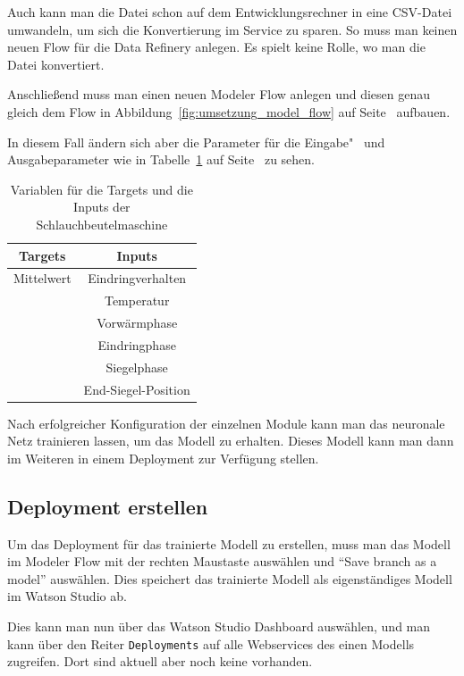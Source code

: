 Auch kann man die Datei schon auf dem Entwicklungsrechner in eine CSV-Datei umwandeln, um sich die Konvertierung im
Service zu sparen. So muss man keinen neuen Flow für die Data Refinery anlegen. Es spielt keine Rolle, wo man die Datei
konvertiert.

Anschließend muss man einen neuen Modeler Flow anlegen und diesen genau gleich dem Flow in
Abbildung~\ref{fig:umsetzung_model_flow} auf Seite~\pageref{fig:umsetzung_model_flow} aufbauen.

In diesem Fall ändern sich aber die Parameter für die Eingabe"~ und Ausgabeparameter wie in
Tabelle~\ref{tab:targets_inputs_siegeln} auf Seite~\pageref{tab:targets_inputs_siegeln} zu sehen.

\begin{table}[h]
    \centering
    \begin{tabular}{|c|c|}
        \hline
        \textbf{Targets} & \textbf{Inputs}\\
        \hline
        \hline
        Mittelwert & Eindringverhalten\\
        \hline
        & Temperatur\\
        \hline
        & Vorwärmphase\\
        \hline
        & Eindringphase\\
        \hline
        & Siegelphase\\
        \hline
        & End-Siegel-Position\\
        \hline
    \end{tabular}
    \caption{Variablen für die Targets und die Inputs der Schlauchbeutelmaschine}
    \label{tab:targets_inputs_siegeln}
\end{table}

Nach erfolgreicher Konfiguration der einzelnen Module kann man das neuronale Netz trainieren lassen, um das Modell zu
erhalten. Dieses Modell kann man dann im Weiteren in einem Deployment zur Verfügung stellen.

\subsection{Deployment erstellen}
Um das Deployment für das trainierte Modell zu erstellen, muss man das Modell im Modeler Flow mit der rechten Maustaste
auswählen und \enquote{Save branch as a model} auswählen. Dies speichert das trainierte Modell als eigenständiges Modell
im Watson Studio ab.

Dies kann man nun über das Watson Studio Dashboard auswählen, und man kann über den Reiter \texttt{Deployments} auf alle
Webservices des einen Modells zugreifen. Dort sind aktuell aber noch keine vorhanden.

